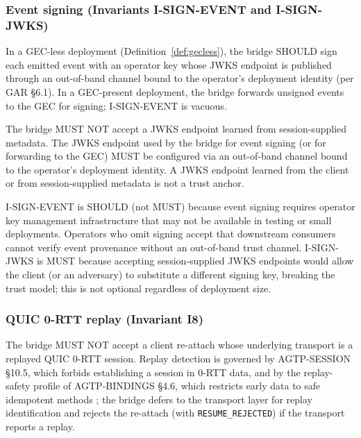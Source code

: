 \subsubsection{Event signing (Invariants I-SIGN-EVENT and I-SIGN-JWKS)}\label{sec:invariants-signing}

\begin{invariant}
\label{inv:isign-sign}
In a GEC-less deployment (Definition~\ref{def:gecless}), the bridge
SHOULD sign each emitted event with an operator key whose JWKS
endpoint is published through an out-of-band channel bound to the
operator's deployment identity (per GAR \S 6.1).
In a GEC-present deployment, the bridge forwards unsigned events to
the GEC for signing; I-SIGN-EVENT is vacuous.
\end{invariant}

\begin{invariant}
\label{inv:isign-jwks}
The bridge MUST NOT accept a JWKS endpoint learned from
session-supplied metadata. The JWKS endpoint used by the bridge for
event signing (or for forwarding to the GEC) MUST be configured via
an out-of-band channel bound to the operator's deployment identity.
A JWKS endpoint learned from the client or from session-supplied
metadata is not a trust anchor.
\end{invariant}

I-SIGN-EVENT is SHOULD (not MUST) because event signing requires
operator key management infrastructure that may not be available in
testing or small deployments. Operators who omit signing accept
that downstream consumers cannot verify event provenance without an
out-of-band trust channel. I-SIGN-JWKS is MUST because accepting
session-supplied JWKS endpoints would allow the client (or an
adversary) to substitute a different signing key, breaking the
trust model; this is not optional regardless of deployment size.

\subsubsection{QUIC 0-RTT replay (Invariant I8)}\label{sec:invariants-quic}

\begin{invariant}\label{inv:I8}
The bridge MUST NOT accept a client re-attach whose underlying
transport is a replayed QUIC 0-RTT session. Replay detection is
governed by AGTP-SESSION \S 10.5, which forbids establishing a session in
0-RTT data, and by the replay-safety profile of AGTP-BINDINGS \S 4.6, which
restricts early data to safe idempotent methods \cite{I-D.hood-agtp-bindings};
the bridge defers to the transport layer for replay identification and rejects the re-attach (with
\texttt{RESUME\_REJECTED}) if the transport reports a replay.
\end{invariant}

